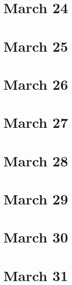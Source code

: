 \section{March 24}

\section{March 25}

\section{March 26}

\section{March 27}

\section{March 28}

\section{March 29}

\section{March 30}

\section{March 31}

